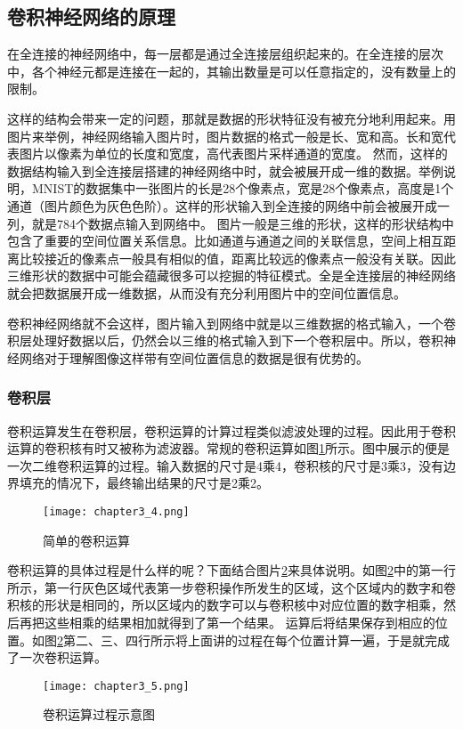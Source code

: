 \subsection{卷积神经网络的原理}
在全连接的神经网络中，每一层都是通过全连接层组织起来的。在全连接的层次中，各个神经元都是连接在一起的，其输出数量是可以任意指定的，没有数量上的限制。

这样的结构会带来一定的问题，那就是数据的形状特征没有被充分地利用起来。用图片来举例，神经网络输入图片时，图片数据的格式一般是长、宽和高。长和宽代表图片以像素为单位的长度和宽度，高代表图片采样通道的宽度。
然而，这样的数据结构输入到全连接层搭建的神经网络中时，就会被展开成一维的数据。举例说明，MNIST的数据集中一张图片的长是28个像素点，宽是28个像素点，高度是1个通道（图片颜色为灰色色阶）。这样的形状输入到全连接的网络中前会被展开成一列，就是784个数据点输入到网络中。
图片一般是三维的形状，这样的形状结构中包含了重要的空间位置关系信息。比如通道与通道之间的关联信息，空间上相互距离比较接近的像素点一般具有相似的值，距离比较远的像素点一般没有关联。因此三维形状的数据中可能会蕴藏很多可以挖掘的特征模式。全是全连接层的神经网络就会把数据展开成一维数据，从而没有充分利用图片中的空间位置信息。

卷积神经网络就不会这样，图片输入到网络中就是以三维数据的格式输入，一个卷积层处理好数据以后，仍然会以三维的格式输入到下一个卷积层中。所以，卷积神经网络对于理解图像这样带有空间位置信息的数据是很有优势的。

\subsubsection{卷积层}
卷积运算发生在卷积层，卷积运算的计算过程类似滤波处理的过程。因此用于卷积运算的卷积核有时又被称为滤波器。常规的卷积运算如图\ref{fig:chapter3_4}所示。图中展示的便是一次二维卷积运算的过程。输入数据的尺寸是4乘4，卷积核的尺寸是3乘3，没有边界填充的情况下，最终输出结果的尺寸是2乘2。
\begin{figure}
    \centering
    \texttt{[image: chapter3\_4.png]}
    \caption{简单的卷积运算\cite{luyujie_216}}
    \label{fig:chapter3_4}
\end{figure}

卷积运算的具体过程是什么样的呢？下面结合图片\ref{fig:chapter3_5}来具体说明。如图\ref{fig:chapter3_5}中的第一行所示，第一行灰色区域代表第一步卷积操作所发生的区域，这个区域内的数字和卷积核的形状是相同的，所以区域内的数字可以与卷积核中对应位置的数字相乘，然后再把这些相乘的结果相加就得到了第一个结果。
运算后将结果保存到相应的位置。如图\ref{fig:chapter3_5}第二、三、四行所示将上面讲的过程在每个位置计算一遍，于是就完成了一次卷积运算。
\begin{figure}
    \centering
    \texttt{[image: chapter3\_5.png]}
    \caption{卷积运算过程示意图\cite{luyujie_216}}
    \label{fig:chapter3_5}
\end{figure}


